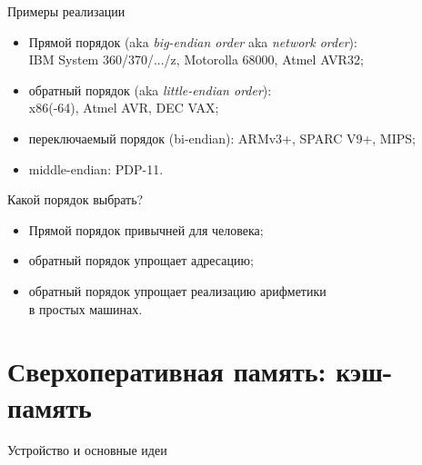 \begin{frame}{Примеры реализации}
\begin{itemize}[<+->]
    \item Прямой порядок (aka \emph{big-endian order} aka \emph{network order}):\\
    IBM System 360/370/.../z, Motorolla 68000, Atmel AVR32;

    \item обратный порядок (aka \emph{little-endian order}):\\
    x86(-64), Atmel AVR, DEC VAX;

    \item переключаемый порядок (bi-endian): ARMv3+, SPARC V9+, MIPS;

    \item middle-endian: PDP-11.
\end{itemize}
\end{frame}

\begin{frame}{Какой порядок выбрать?}
\pause
\begin{itemize}\itemsep=10pt
    \item Прямой порядок привычней для человека;
    \item обратный порядок упрощает адресацию;
    \item обратный порядок упрощает реализацию арифметики\\
         в простых машинах.
\end{itemize}
\end{frame}

\section {Сверхоперативная память: кэш-память}

\begin{frame}{Устройство и основные идеи}
\end{frame}

